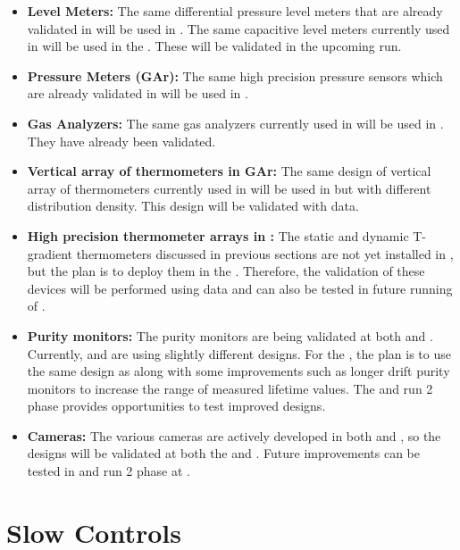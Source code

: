 \begin{itemize}
    \item {\bf Level Meters:} The same differential pressure level meters that are already validated in  will be used in  . The same capacitive level meters currently used in  will be used in the  . These will be validated in the upcoming  run. 
    \item {\bf Pressure Meters (GAr):} The same high precision pressure sensors which are already validated in  will be used in  .
    \item {\bf Gas Analyzers:} The same gas analyzers currently used in  will be used in  . They have already been validated.
    \item {\bf Vertical array of thermometers in GAr:} The same design of vertical array of thermometers currently used in  will be used in   but with different distribution density. This design will be validated with  data.
    \item {\bf High precision thermometer arrays in \lar:} The static and dynamic T-gradient thermometers discussed in previous sections are not yet installed in , but the plan is to deploy them in the  . Therefore, the validation of these devices will be performed using  data and can also be tested in future running of .
    \item {\bf Purity monitors:} The purity monitors are being validated at both  and . Currently,  and  are using slightly different designs. For the  , the plan is to use the same design as  along with some improvements such as longer drift purity monitors to increase the range of measured lifetime values. The  and  run 2 phase provides opportunities to test improved designs.  
    \item {\bf Cameras:} The various cameras are actively developed in both  and , so the designs will be validated at both the  and . Future improvements can be tested in  and  run 2 phase at .
\end{itemize}

\section{Slow Controls}

